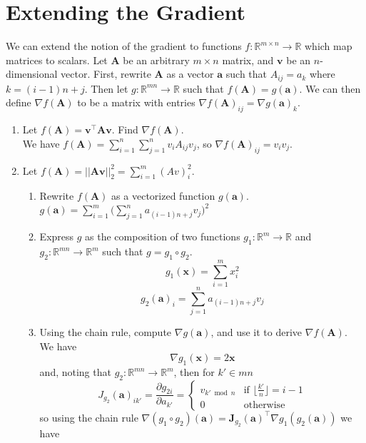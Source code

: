 \documentclass{article}
\begin{document}
\section{Extending the Gradient}
We can extend the notion of the gradient to functions $f: \mathbb{R}^{m \times n} \rightarrow \mathbb{R}$ which map matrices to scalars. Let $\mathbf{A}$ be an arbitrary $m \times n$ matrix, and $\mathbf{v}$ be an $n$-dimensional vector. First, rewrite $\mathbf{A}$ as a vector $\mathbf{a}$ such that $A_{ij} = a_k$ where $k = (i-1)n + j$. Then let $g: \mathbb{R}^{mn} \rightarrow \mathbb{R}$ such that $f(\mathbf{A}) = g(\mathbf{a})$. We can then define $\nabla f(\mathbf{A})$ to be a matrix with entries $\nabla f(\mathbf{A})_{ij} = \nabla g(\mathbf{a})_k$.
\begin{enumerate}[label=\arabic*.]
\item Let $f(\mathbf{A}) = \mathbf{v^\top Av}$. Find $\nabla f(\mathbf{A})$.\\
	{\color{blue} We have $f(\mathbf{A}) = \sum_{i=1}^n\sum_{j=1}^n v_iA_{ij}v_j$, so $\nabla f(\mathbf{A})_{ij} = v_iv_j$.}
\item Let $f(\mathbf{A}) = ||\mathbf{Av}||_2^2 = \sum_{i=1}^m (Av)_i^2$.
	\begin{enumerate}[label=\alph*.]
	\item Rewrite $f(\mathbf{A})$ as a vectorized function $g(\mathbf{a})$.\\
		{\color{blue}$g(\mathbf{a}) = \sum_{i=1}^m\big(\sum_{j=1}^na_{(i-1)n + j}v_j\big)^2$}
	\item Express $g$ as the composition of two functions $g_1: \mathbb{R}^m \rightarrow \mathbb{R}$ and $g_2: \mathbb{R}^{mn} \rightarrow \mathbb{R}^m$ such that $g = g_1 \circ g_2$.\\
		{\color{blue} $$g_1(\mathbf{x}) = \sum_{i=1}^m x_i^2$$ $$g_2(\mathbf{a})_i = \sum_{j=1}^n a_{(i-1)n+j}v_j$$}
	\item Using the chain rule, compute $\nabla g(\mathbf{a})$, and use it to derive $\nabla f(\mathbf{A})$.\\
		{\color{blue}
We have
	$$\nabla g_1(\mathbf{x}) = 2\mathbf{x}$$
	and, noting that $g_2: \mathbb{R}^{mn} \rightarrow \mathbb{R}^m$, then for $k' \in mn$
	$$J_{g_2}(\mathbf{a})_{ik'} = \frac{\partial g_{2i}}{\partial a_{k'}} = \begin{cases} v_{k' \bmod{n}} & \text{if } \lfloor\frac{k'}{n}\rfloor = i-1\\ 0 & \text{otherwise}\end{cases}$$
	so using the chain rule $\nabla (g_1 \circ g_2)(\mathbf{a}) = \mathbf{J}_{g_2}(\mathbf{a})^\top\nabla g_1(g_2(\mathbf{a}))$ we have 
}
\end{enumerate}
\end{enumerate}
\end{document}
